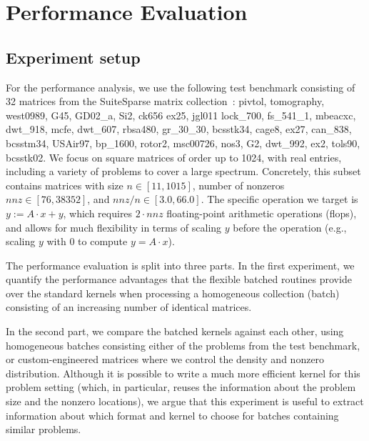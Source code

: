 \section{Performance Evaluation}
\label{2017-batched-spmv:sec:s4-experiments}

\subsection{Experiment setup}
For the performance analysis, we use the following test benchmark consisting of 32 matrices from the
SuiteSparse matrix collection~\cite{ufmc}: 
{\sc pivtol}, {\sc tomography},
{\sc west0989}, {\sc G45}, 
{\sc GD02\_a}, {\sc Si2},
{\sc ck656} {\sc ex25}, 
{\sc jgl011} {\sc lock\_700}, 
{\sc fs\_541\_1}, {\sc mbeacxc}, 
{\sc dwt\_918}, {\sc mcfe}, 
{\sc dwt\_607}, {\sc rbsa480}, 
{\sc gr\_30\_30}, {\sc bcsstk34}, 
{\sc cage8}, {\sc ex27}, 
{\sc can\_838}, {\sc bcsstm34}, 
{\sc USAir97}, {\sc bp\_1600}, 
{\sc rotor2}, {\sc msc00726}, 
{\sc nos3}, {\sc G2}, 
{\sc dwt\_992}, {\sc ex2}, 
{\sc tols90}, {\sc bcsstk02}. 
We focus on square matrices of order up to 1024, 
with real entries,
including a variety of problems
to cover a large spectrum.
Concretely, this subset contains matrices with size $n \in [11,1015]$, number of nonzeros
$nnz \in [76,38352]$, and $nnz/n \in [3.0,66.0]$.
The specific operation we target is $y := A\cdot x + y$,
which requires $2\cdot nnz$ floating-point arithmetic operations (flops),
and allows for much flexibility in terms of scaling $y$ before the
operation (e.g., scaling $y$ with 0 to compute $y=A\cdot x$).

The performance evaluation is split into three parts. 
In the first experiment, we quantify the performance advantages that the 
flexible batched routines provide
over the standard \spmv kernels when processing a homogeneous collection 
(batch) consisting
of an increasing number of identical matrices.

In the second part, we compare the batched kernels against each other, using 
homogeneous batches consisting either of the problems from the test benchmark, 
or custom-engineered matrices where we control the density and
nonzero distribution.
Although it is possible to write a much more efficient kernel for this 
problem setting (which, in particular, reuses the information about the problem 
size and the nonzero locations),
we argue that this experiment is useful to extract information about which 
format and kernel
to choose for batches containing similar problems.

